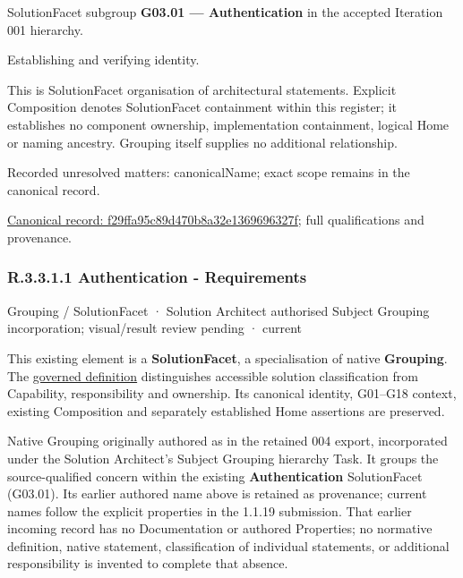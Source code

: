 SolutionFacet subgroup \textbf{G03.01 — Authentication} in the accepted Iteration 001 hierarchy.



Establishing and verifying identity.



This is SolutionFacet organisation of architectural statements. Explicit Composition denotes SolutionFacet containment within this register; it establishes no component ownership, implementation containment, logical Home or naming ancestry. Grouping itself supplies no additional relationship.


{\small Recorded unresolved matters: canonicalName; exact scope remains in the canonical record.}\par
{\footnotesize \href{../../../../../../../continuum/grouping/f29ffa95c89d470b8a32e1369696327f.md}{Canonical record: f29ffa95c89d470b8a32e1369696327f}; full qualifications and provenance.}\par
\subsubsection*{R.3.3.1.1 Authentication - Requirements}
\label{navigation:R.3.3.1.1}

\label{element:395d77eea25d40b0b74321dc7aabd283}
{\small Grouping / SolutionFacet · Solution Architect authorised Subject Grouping incorporation; visual/result review pending · current}\par

This existing element is a \textbf{SolutionFacet}, a specialisation of native
\textbf{Grouping}. The \href{\detokenize{../../../../../../../governance/continuum-representation.md#solutionfacet-classification--1119-candidate}}{governed definition}
distinguishes accessible solution classification from Capability, responsibility
and ownership. Its canonical identity, G01–G18 context, existing Composition
and separately established Home assertions are preserved.



Native Grouping originally authored as \texttt{} in the retained 004 export,
incorporated under the Solution Architect's Subject Grouping hierarchy Task.
It groups the source-qualified \texttt{} concern within
the existing \textbf{Authentication} SolutionFacet (G03.01). Its earlier authored name above is retained as provenance; current names
follow the explicit properties in the 1.1.19 submission.
That earlier incoming record has no Documentation or authored Properties; no normative
definition, native statement, classification of individual statements, or
additional responsibility is invented to complete that absence.



